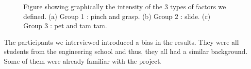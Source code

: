 \begin{figure}

    \begin{minipage}{.5\linewidth}
    \centering
    \end{minipage}%
    \begin{minipage}{.5\linewidth}
    \centering
    \end{minipage}\par\medskip
    \centering
    
    \caption{Figure showing graphically the intensity of the 3 types of factors we defined. (a) Group 1 : pinch and grasp. (b) Group 2 : slide. (c) Group 3 : pet and tam tam.}
    \label{fig:main}
    \end{figure}


The participants we interviewed introduced a bias in the results.
They were all students from the engineering school and thus, they all had a similar background.
Some of them were already familiar with the project.
